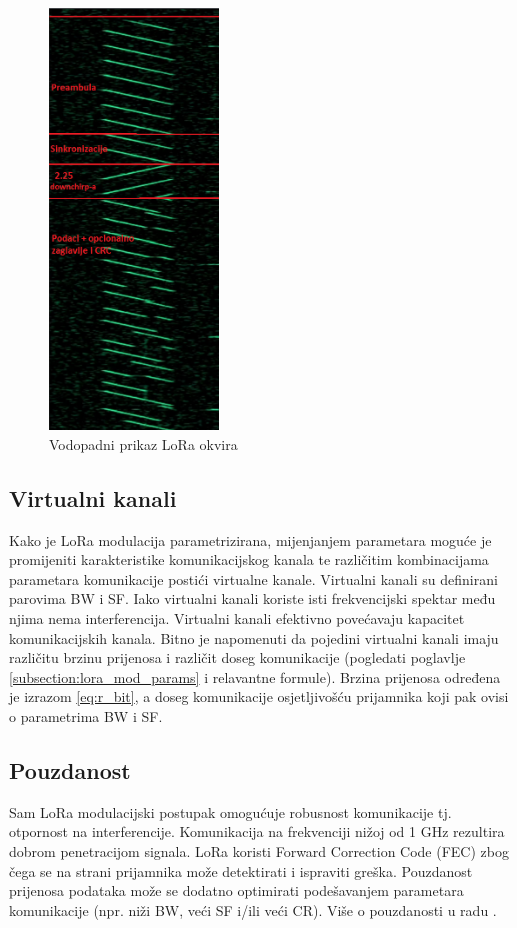 \begin{figure}[ht!]
\centering
\includegraphics[width=0.4\textwidth]{images/chirps_frame.png}
\caption{Vodopadni prikaz LoRa okvira}
\label{img:chirps_frame}
\end{figure}

\newpage
\subsection{Virtualni kanali}
\label{subsection:lora_virt_channel}
Kako je LoRa modulacija parametrizirana, mijenjanjem parametara moguće je promijeniti karakteristike komunikacijskog kanala te različitim kombinacijama parametara komunikacije postići virtualne kanale.
Virtualni kanali su definirani parovima BW i SF. Iako virtualni kanali koriste isti frekvencijski spektar među njima nema interferencija. Virtualni kanali efektivno povećavaju kapacitet komunikacijskih kanala. Bitno je napomenuti da pojedini virtualni kanali imaju različitu brzinu prijenosa i različit doseg komunikacije (pogledati poglavlje \ref{subsection:lora_mod_params} i relavantne formule). Brzina prijenosa određena je izrazom \ref{eq:r_bit}, a doseg komunikacije osjetljivošću prijamnika koji pak ovisi o parametrima BW i SF.

\subsection{Pouzdanost}
\label{subsection:lora_reliability}
Sam LoRa modulacijski postupak omogućuje robusnost komunikacije tj. otpornost na interferencije. Komunikacija na frekvenciji nižoj od 1 GHz rezultira dobrom penetracijom signala.
LoRa koristi Forward Correction Code (FEC) zbog čega se na strani prijamnika može detektirati i ispraviti greška. Pouzdanost prijenosa podataka može se dodatno optimirati podešavanjem parametara komunikacije (npr. niži BW, veći SF i/ili veći CR). Više o pouzdanosti u radu \cite{pozdanost}.
